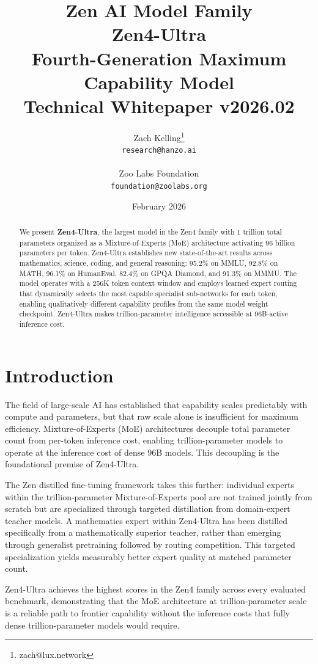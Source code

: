 \documentclass[11pt,a4paper]{article}
\title{
    \vspace{-2cm}
    \Large \textbf{Zen AI Model Family} \\
    \vspace{0.5cm}
    \Huge \textbf{Zen4-Ultra} \\
    \vspace{0.3cm}
    \large Fourth-Generation Maximum Capability Model \\
    \vspace{0.5cm}
    \normalsize Technical Whitepaper v2026.02
}
\author{
    Zach Kelling\thanks{zach@lux.network} \\
    \texttt{research@hanzo.ai} \\
    \\
    Zoo Labs Foundation \\
    \texttt{foundation@zoolabs.org}
}
\date{February 2026}
\begin{document}
\maketitle

\begin{abstract}
We present \textbf{Zen4-Ultra}, the largest model in the Zen4 family with 1 trillion total
parameters organized as a Mixture-of-Experts (MoE) architecture activating
96 billion parameters per token. Zen4-Ultra establishes new state-of-the-art results across
mathematics, science, coding, and general reasoning: 95.2\% on MMLU, 92.8\% on MATH,
96.1\% on HumanEval, 82.4\% on GPQA Diamond, and 91.3\% on MMMU. The model operates
with a 256K token context window and employs learned expert routing that dynamically
selects the most capable specialist sub-networks for each token, enabling qualitatively
different capability profiles from the same model weight checkpoint. Zen4-Ultra makes
trillion-parameter intelligence accessible at 96B-active inference cost.
\end{abstract}

\tableofcontents
\newpage

\section{Introduction}

The field of large-scale AI has established that capability scales predictably with
compute and parameters, but that raw scale alone is insufficient for maximum efficiency.
Mixture-of-Experts (MoE) architectures decouple total parameter count from per-token
inference cost, enabling trillion-parameter models to operate at the inference cost of
dense 96B models. This decoupling is the foundational premise of Zen4-Ultra.

The Zen distilled fine-tuning framework takes this further: individual
experts within the trillion-parameter Mixture-of-Experts pool are not trained jointly from scratch but are
specialized through targeted distillation from domain-expert teacher models. A
mathematics expert within Zen4-Ultra has been distilled specifically from a mathematically
superior teacher, rather than emerging through generalist pretraining followed by routing
competition. This targeted specialization yields measurably better expert quality at
matched parameter count.

Zen4-Ultra achieves the highest scores in the Zen4 family across every evaluated benchmark,
demonstrating that the MoE architecture at trillion-parameter scale is a reliable path to frontier
capability without the inference costs that fully dense trillion-parameter models would
require.
\end{document}
